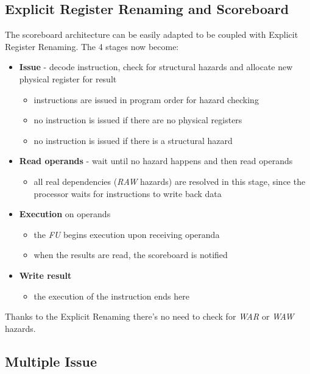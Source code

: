 \documentclass[english]{article}
\begin{document}
\subsection{Explicit Register Renaming and Scoreboard}

The scoreboard architecture can be easily adapted to be coupled with Explicit Register Renaming.
The 4 stages now become:

\begin{itemize}
  \item \textbf{Issue} - decode instruction, check for structural hazards and allocate new physical register for result
        \begin{itemize}
          \item instructions are issued in program order for hazard checking
          \item no instruction is issued if there are no physical registers
          \item no instruction is issued if there is a structural hazard
        \end{itemize}
  \item \textbf{Read operands} - wait until no hazard happens and then read operands
        \begin{itemize}
          \item all real dependencies (\textit{RAW} hazards) are resolved in this stage, since the processor waits for instructions to write back data
        \end{itemize}
  \item \textbf{Execution} on operands
        \begin{itemize}
          \item the \textit{FU} begins execution upon receiving operanda
          \item when the results are read, the scoreboard is notified
        \end{itemize}
  \item \textbf{Write result}
        \begin{itemize}
          \item the execution of the instruction ends here
        \end{itemize}
\end{itemize}

\bigskip
Thanks to the Explicit Renaming there's no need to check for \textit{WAR} or \textit{WAW} hazards.

\subsection{Multiple Issue}
\end{document}
